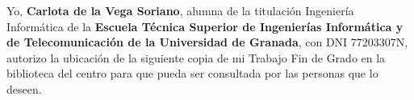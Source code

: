 Yo, \textbf{Carlota de la Vega Soriano}, alumna de la titulación Ingeniería Informática de la \textbf{Escuela Técnica Superior de Ingenierías Informática y de Telecomunicación de la Universidad de Granada}, con DNI 77203307N, autorizo la ubicación de la siguiente copia de mi Trabajo Fin de Grado en la biblioteca del centro para que pueda ser consultada por las personas que lo deseen.